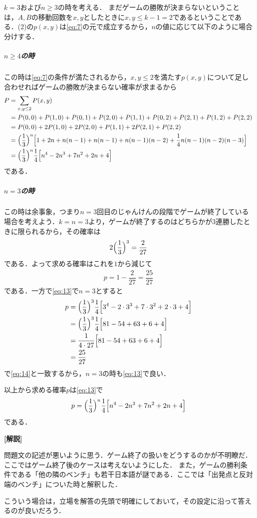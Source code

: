 \documentclass[../../main.tex]{subfiles}
\begin{document}
$k=3$および$n \ge 3$の時を考える．
まだゲームの勝敗が決まらないということは，$A,B$の移動回数を$x,y$としたときに$x,y\le k-1=2$であるということである．(2)の$p(x,y)$は\cref{eq:7}の元で成立するから，$n$の値に応じて以下のように場合分けする．

\subparagraph{$n \ge 4$の時}

この時は\cref{eq:7}の条件が満たされるから，$x,y \le 2$を満たす$p(x,y)$について足し合わせればゲームの勝敗が決まらない確率が求まるから
\begin{align}
  P
  &= \sum_{x, y \le 2} P(x, y) \\
  &= P(0,0) + P(1,0) + P(0,1) + P(2,0) + P(1,1) + P(0,2) + P(2,1) + P(1,2) + P(2,2) \\
  &= P(0,0) + 2 P(1,0) + 2 P(2,0) + P(1,1) + 2 P(2,1) + P(2,2) \\
  &= \Bigl(\dfrac{1}{3}\Bigr)^n \Bigl[ 1 + 2n + n(n-1) + n(n-1) + n(n-1)(n-2) + \dfrac{1}{4}n(n-1)(n-2)(n-3) \Bigr] \\
  &= \Bigl(\dfrac{1}{3}\Bigr)^n \dfrac{1}{4} \Bigl[ n^4 - 2n^3 + 7n^2 + 2n + 4 \Bigr] \label{eq:13}
\end{align}
である．

\subparagraph{$n = 3$の時}

この時は余事象，つまり$n=3$回目のじゃんけんの段階でゲームが終了している　場合を考えよう．$k=n=3$より，ゲームが終了するのはどちらかが$3$連勝したときに限られるから，その確率は
\begin{align}
  2\Bigl(\dfrac{1}{3}\Bigr)^3 = \dfrac{2}{27}
\end{align}
である．よって求める確率はこれを$1$から減じて
\begin{align}
  p = 1 - \dfrac{2}{27} = \dfrac{25}{27} \label{eq:14}
\end{align}
である．一方で\cref{eq:13}で$n=3$とすると
\begin{align}
  p
  &= \Bigl(\dfrac{1}{3}\Bigr)^3 \dfrac{1}{4} \Bigl[ 3^4 - 2\cdot 3^3 + 7\cdot 3^2 + 2\cdot 3 + 4 \Bigr] \\
  &= \Bigl(\dfrac{1}{3}\Bigr)^3 \dfrac{1}{4} \Bigl[ 81 - 54 + 63 + 6 + 4 \Bigr] \\
  &= \dfrac{1}{4\cdot 27} \Bigl[ 81 - 54 + 63 + 6 + 4 \Bigr] \\
  &= \dfrac{25}{27}
\end{align}
で\cref{eq:14}と一致するから，$n=3$の時も\cref{eq:13}で良い．
\casesend

以上から求める確率$p$は\cref{eq:13}で
\begin{align}
  p = \Bigl(\dfrac{1}{3}\Bigr)^n \dfrac{1}{4} \Bigl[ n^4 - 2n^3 + 7n^2 + 2n + 4 \Bigr]
\end{align}
である．

{\bf [解説]}

問題文の記述が悪いように思う．ゲーム終了の扱いをどうするのかが不明瞭だ．ここではゲーム終了後のケースは考えないようにした．
また，ゲームの勝利条件である「他の隣のベンチ」も若干日本語が謎である．ここでは「出発点と反対端のベンチ」についた時と解釈した．

こういう場合は，立場を解答の先頭で明確にしておいて，その設定に沿って答えるのが良いだろう．
\end{document}
